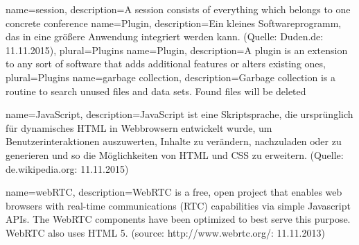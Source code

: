 {
	name=session,
	description={A session consists of everything which belongs to one concrete conference}
}
{
	name=Plugin,
	description={Ein kleines Softwareprogramm, das in eine größere Anwendung integriert werden kann. (Quelle: Duden.de: 11.11.2015)},
	plural=Plugins
}
{
	name=Plugin,
	description={A plugin is an extension to any sort of software that adds additional features or alters existing ones},
	plural=Plugins
}
{
name=garbage collection,
description={Garbage collection is a routine to search unused files and data sets. Found files will be deleted}
}



{
name=JavaScript,
description={JavaScript ist eine Skriptsprache, die ursprünglich für dynamisches HTML in Webbrowsern entwickelt wurde, um Benutzerinteraktionen auszuwerten, Inhalte zu verändern, nachzuladen oder zu generieren und so die Möglichkeiten von HTML und CSS zu erweitern. (Quelle: de.wikipedia.org: 11.11.2015)}
}

{
name=webRTC,
description={WebRTC is a free, open project that enables web browsers with real-time communications (RTC) capabilities via simple Javascript APIs. The WebRTC components have been optimized to best serve this purpose. WebRTC also uses HTML 5. (source: http://www.webrtc.org/: 11.11.2013)}
}

